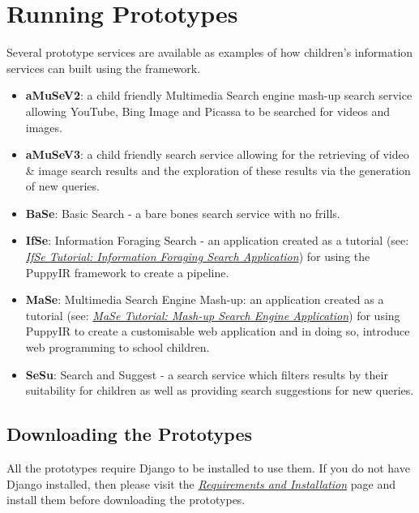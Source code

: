 \documentclass[letterpaper,10pt,english]{sphinxmanual}
\begin{document}
\section{Running Prototypes}
\label{prototypes::doc}\label{prototypes:running-prototypes}\label{prototypes:prototypes}
Several prototype services are available as examples of how children's information services can built using the framework.
\begin{itemize}
\item {} 
\textbf{aMuSeV2}: a child friendly Multimedia Search engine mash-up search service allowing YouTube, Bing Image and Picassa to be searched for videos and images.

\item {} 
\textbf{aMuSeV3}: a child friendly search service allowing for the retrieving of video \& image search results and the exploration of these results via the generation of new queries.

\item {} 
\textbf{BaSe}: Basic Search - a bare bones search service with no frills.

\item {} 
\textbf{IfSe}: Information Foraging Search - an application created as a tutorial (see: {\hyperref[ifse-tutorial:information-foraging-puppyir-tutorial]{\emph{IfSe Tutorial: Information Foraging Search Application}}}) for using the PuppyIR framework to create a pipeline.

\item {} 
\textbf{MaSe}: Multimedia Search Engine Mash-up: an application created as a tutorial (see: {\hyperref[mase-tutorial:mase-mash-up-search-engine-puppyir-tutorial]{\emph{MaSe Tutorial: Mash-up Search Engine Application}}}) for using PuppyIR to create a customisable web application and in doing so, introduce web programming to school children.

\item {} 
\textbf{SeSu}: Search and Suggest - a search service which filters results by their suitability for children as well as providing search suggestions for new queries.

\end{itemize}


\subsection{Downloading the Prototypes}
\label{prototypes:downloading-the-prototypes}
All the prototypes require Django to be installed to use them. If you do not have Django installed, then please visit the {\hyperref[installation:requirements-and-installation]{\emph{Requirements and Installation}}} page and install them before downloading the prototypes.
\end{document}
